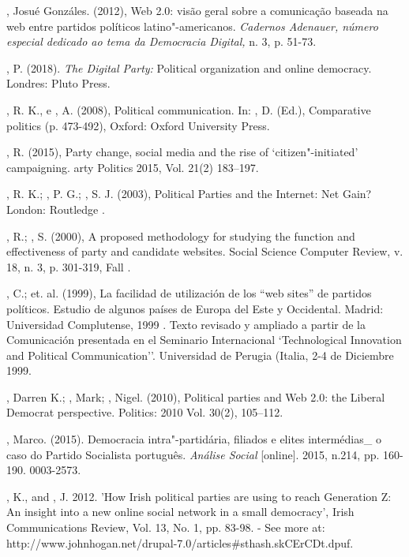 \begin{Parskip}
, Josué Gonzáles. (2012), Web 2.0: visão geral sobre a
comunicação baseada na web entre partidos políticos latino"-americanos.
\emph{Cadernos Adenauer, número especial dedicado ao tema da Democracia
Digital,} n. 3, p. 51-73.

, P. (2018). \emph{The Digital Party:} Political organization
and online democracy. Londres: Pluto Press.

, R. K., e , A. (2008), Political communication. In:
, D. (Ed.), Comparative politics (p. 473-492), Oxford: Oxford
University Press.

, R. (2015), Party change, social media and the rise of
`citizen"-initiated' campaigning. arty Politics 2015, Vol. 21(2)
183--197.

, R. K.; , P. G.; , S. J. (2003), Political Parties and
the Internet: Net Gain? London: Routledge .

, R.; , S. (2000), A proposed methodology for studying the
function and effectiveness of party and candidate websites. Social
Science Computer Review, v. 18, n. 3, p. 301-319, Fall .

, C.; et. al. (1999), La facilidad de utilización de los ``web
sites'' de partidos políticos. Estudio de algunos países de Europa del
Este y Occidental. Madrid: Universidad Complutense, 1999 . Texto
revisado y ampliado a partir de la Comunicación presentada en el
Seminario Internacional `Technological Innovation and Political
Communication''. Universidad de Perugia (Italia, 2-4 de Diciembre 1999.

, Darren K.; , Mark; , Nigel. (2010), Political
parties and Web 2.0: the Liberal Democrat perspective. Politics: 2010
Vol. 30(2), 105--112.

, Marco. (2015). Democracia intra"-partidária, filiados e elites
intermédias\_ o caso do Partido Socialista português. \emph{Análise
Social} {[}online{]}. 2015, n.214, pp. 160-190.  0003-2573.

, K., and , J. 2012. 'How Irish political parties are using
 to reach Generation Z: An insight into a new online social network
in a small democracy', Irish Communications Review, Vol. 13, No. 1, pp.
83-98. - See more at:
http://www.johnhogan.net/drupal-7.0/articles\#sthash.skCErCDt.dpuf. %


\end{Parskip}
